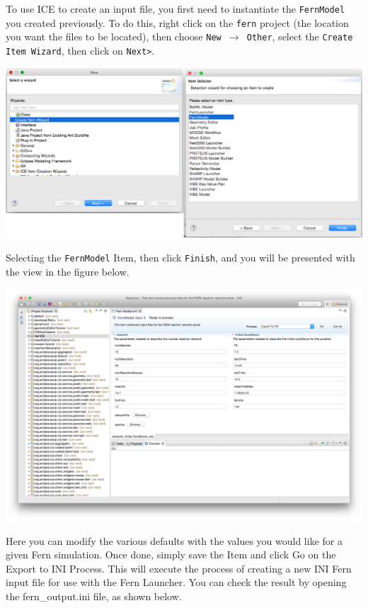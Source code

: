 To use ICE to create an input file, you first need to instantiate the
\texttt{FernModel} you created previously. To do this, right click on the
\texttt{fern} project (the location you want the files to be located), then
choose \texttt{New $\rightarrow$ Other},  select the
\texttt{Create Item Wizard}, then click on \texttt{Next>}.
\begin{center} \includegraphics[width=\textwidth]{figures/creatingFernModelItem}
\end{center}
Selecting the \texttt{FernModel} Item, then click \texttt{Finish}, and you will
be presented with the view in the figure below. 
\begin{center} \includegraphics[width=\textwidth]{figures/fernmodelItem}
\end{center}
Here you can modify the various defaults with the values you would like for a
given Fern simulation. Once done, simply save the Item and click Go on the
Export to INI Process. This will execute the process of creating a new INI Fern
input file for use with the Fern Launcher. You can check the result by opening
the fern\_output.ini file, as shown below. 
